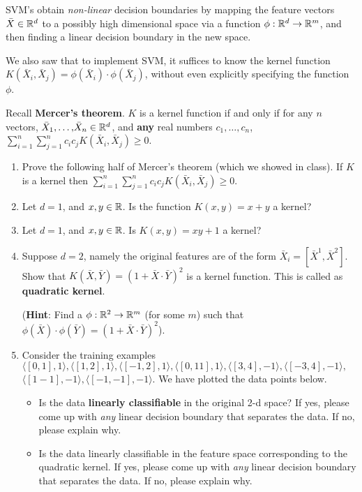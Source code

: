 \documentclass[11pt]{article}
\newenvironment{problem}[2][Problem]{\begin{trivlist}
\item[\hskip \labelsep {\bfseries #1}\hskip \labelsep {\bfseries #2.}]}{\end{trivlist}}
\begin{document}
\begin{problem}{1. (15 points)}
SVM's obtain \emph{non-linear} decision boundaries by mapping the feature vectors $\bar X\in \mathbb{R}^d$ to a possibly high dimensional space via a function $\phi:\mathbb{R}^d\to\mathbb{R}^m$, and then finding a linear decision boundary in the new space. 

We also saw that to implement SVM, it suffices to know the kernel function $K(\bar X_i, \bar X_j)=\phi(\bar X_i)\cdot \phi(\bar X_j)$, without even explicitly specifying the function $\phi$. 

Recall \textbf{Mercer's theorem}. $K$ is a kernel function if and only if for any $n$ vectors, $\bar X_1{,}\ldots{,} \bar X_n\in \mathbb{R}^d$, and \textbf{any} real numbers $c_1, \ldots, c_n$, $\sum_{i=1}^n\sum_{j=1}^n c_i c_j K(\bar X_i, \bar X_j)\ge0$. 

\begin{enumerate}
\item 
Prove the following half of Mercer's theorem (which we showed in class). If $K$ is a kernel then $\sum_{i=1}^n\sum_{j=1}^n c_i c_j K(\bar X_i, \bar X_j)\ge0$. 
\item
Let $d=1$, and $x,y\in \mathbb{R}$. Is the function $K(x,y)=x+y$ a kernel? 
\item 
Let $d=1$, and $x,y\in\mathbb{R}$. Is $K(x,y)=xy+1$ a kernel?
\item
Suppose $d=2$, namely the original features are of the form $\bar X_i = [\bar X^1, \bar X^2]$. Show that $K(\bar X, \bar Y)=(1+\bar X\cdot \bar Y)^2$ is a kernel function. This is called as \textbf{quadratic kernel}.
 
(\textbf{Hint}: Find a $\phi:\mathbb{R}^2\to \mathbb{R}^m$ (for some $m$) such that $\phi(\bar X)\cdot \phi(\bar Y) = (1+\bar X\cdot \bar Y)^2$). 
\item
Consider the training examples $\langle[0, 1], 1\rangle, \langle[1, 2], 1\rangle,\langle[-1, 2], 1\rangle,\langle[0, 11], 1\rangle, \langle[3, 4], -1\rangle, \langle[-3, 4], -1\rangle,$ $ \langle[1 -1], -1\rangle, \langle[-1, -1], -1\rangle$. We have plotted the data points below.
\begin{itemize}
\item
Is the data \textbf{linearly classifiable} in the original 2-d space? 
If yes, please come up with \emph{any} linear decision boundary that separates the data.
If no, please explain why.
\item 
Is the data linearly classifiable in the feature space corresponding to the quadratic kernel. 
If yes, please come up with \emph{any} linear decision boundary that separates the data.
If no, please explain why.
\end{itemize}
\end{enumerate}


\end{problem}
\end{document}

